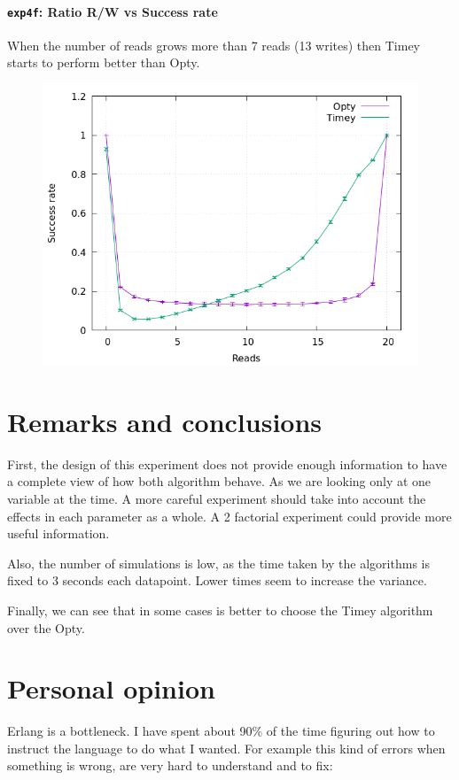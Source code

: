 \documentclass[a4paper, 11pt]{article}
\begin{document}
\newpage
\paragraph{\texttt{exp4f}: Ratio R/W vs Success rate}

When the number of reads grows more than 7 reads (13 writes) then Timey starts 
to perform better than Opty.
\nopagebreak
\begin{figure}[H]
\centering
\includegraphics[width=.8\linewidth]{exp4/f/fig.png}
\end{figure}


\section{Remarks and conclusions}

First, the design of this experiment does not provide enough information to have 
a complete view of how both algorithm behave. As we are looking only at one 
variable at the time. A more careful experiment should take into account the 
effects in each parameter as a whole. A 2 factorial experiment could provide 
more useful information.

Also, the number of simulations is low, as the time taken by the algorithms is 
fixed to 3 seconds each datapoint. Lower times seem to increase the variance.

Finally, we can see that in some cases is better to choose the Timey algorithm 
over the Opty.

\section{Personal opinion}

Erlang is a bottleneck. I have spent about 90\% of the time figuring out how to 
instruct the language to do what I wanted. For example this kind of errors when 
something is wrong, are very hard to understand and to fix:
\end{document}
